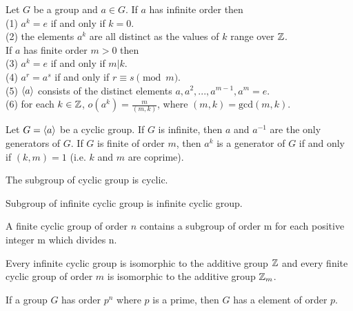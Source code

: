 \begin{proposition}{}{}
    Let $G$ be a group and $a\in G$.
    If $a$ has infinite order then\\
    (1) $a^k=e$ if and only if $k=0$.\\
    (2) the elements $a^k$ are all distinct as the values of $k$ range over $\mathbb{Z}$.\\
    If $a$ has finite order $m>0$ then \\
    (3) $a^k=e$ if and only if $m|k$.\\
    (4) $a^r=a^s$ if and only if $r\equiv s\pmod m$.\\
    (5) $\langle a\rangle$ consists of the distinct elements $a,a^2,...,a^{m-1},a^m=e$.\\
    (6) for each $k\in \mathbb{Z}$, $o(a^k)=\frac{m}{(m,k)}$, where $(m,k)=\text{gcd}(m,k)$. 
\end{proposition}

\begin{proposition}{}{}
    Let $G=\langle a\rangle$ be a cyclic group.
    If $G$ is infinite, then $a$ and $a^{-1}$ are the only generators of $G$.
    If $G$ is finite of order $m$, then $a^k$ is a generator of $G$ if and only if $(k,m)=1$ (i.e. $k$ and $m$ are coprime). 
\end{proposition}

\begin{proposition}{}{}
    The subgroup of cyclic group is cyclic.
\end{proposition}

\begin{proposition}{}{}
    Subgroup of infinite cyclic group is infinite cyclic group.
\end{proposition}


\begin{proposition}{}{}
    A finite cyclic group of order $n$ contains a subgroup of order m for each positive integer m which
divides n.
\end{proposition}

\begin{proposition}{}{}
    Every infinite cyclic group is isomorphic to the additive group $\mathbb{Z}$
    and every finite cyclic group of order $m$ 
    is isomorphic to the additive group $\mathbb{Z}_m$.
\end{proposition}

\begin{proposition}{}{}
    If a group $G$ has order $p^n$ where $p$
    is a prime, then $G$
    has a element of order $p$.
\end{proposition}

